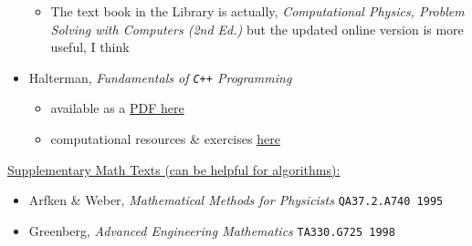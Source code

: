 \begin{itemize}
\begin{itemize}
      \item The text book in the Library is actually, \textit{Computational Physics, Problem Solving with Computers (2nd Ed.)} but the updated online version is more useful, I think
    \end{itemize}
    \item Halterman, \textit{Fundamentals of \texttt{C++} Programming}
    \begin{itemize}
      \item available as a \href{http://python.cs.southern.edu/cppbook/progcpp.pdf}{PDF here}
      \item computational resources \& exercises \href{https://github.com/halterman/CppBook-SourceCode}{here}
    \end{itemize}
  \end{itemize}
  

\underline{Supplementary Math Texts (can be helpful for algorithms):}

  \begin{itemize}
    \item Arfken \& Weber, \textit{Mathematical Methods for Physicists} \texttt{QA37.2.A740 1995}
    \item Greenberg, \textit{Advanced Engineering Mathematics} \texttt{TA330.G725 1998}
  \end{itemize}  
  